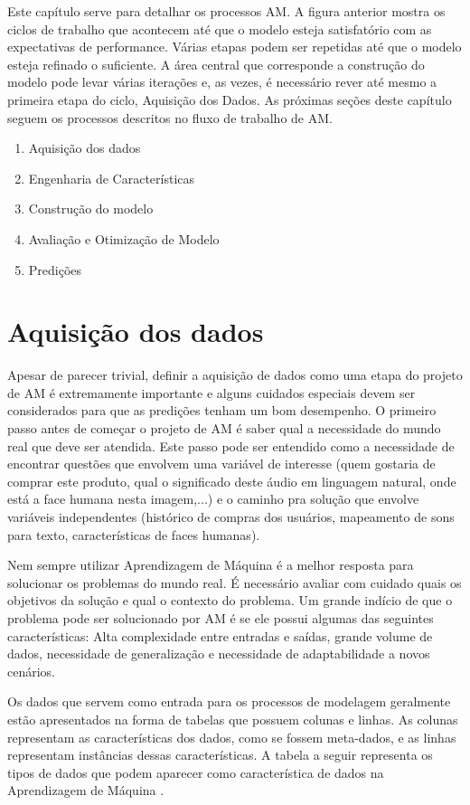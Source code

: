 Este capítulo serve para detalhar os processos AM. A figura anterior mostra os ciclos de trabalho que acontecem até que o modelo esteja satisfatório com as expectativas de performance. Várias etapas podem ser repetidas até que o modelo esteja refinado o suficiente. A área central que corresponde a construção do modelo pode levar várias iterações e, as vezes, é necessário rever até mesmo a primeira etapa do ciclo, Aquisição dos Dados. As próximas seções deste capítulo seguem os processos descritos no fluxo de trabalho de AM.

\begin{enumerate}
\item Aquisição dos dados
\item Engenharia de Características
\item Construção do modelo
\item Avaliação e Otimização de Modelo
\item Predições
\end{enumerate}

\section{Aquisição dos dados}
Apesar de parecer trivial, definir a aquisição de dados como uma etapa do projeto de AM é extremamente importante e alguns cuidados especiais devem ser considerados para que as predições tenham um bom desempenho. O primeiro passo antes de começar o projeto de AM é saber qual a necessidade do mundo real que deve ser atendida. Este passo pode ser entendido como a necessidade de encontrar questões que envolvem uma variável de interesse (quem gostaria de comprar este produto, qual o significado deste áudio em linguagem natural, onde está a face humana nesta imagem,...) e o caminho pra solução que envolve variáveis independentes (histórico de compras dos usuários, mapeamento de sons para texto, características de faces humanas).

Nem sempre utilizar Aprendizagem de Máquina é a melhor resposta para solucionar os problemas do mundo real. É necessário avaliar com cuidado quais os objetivos da solução e qual o contexto do problema. Um grande indício de que o problema pode ser solucionado por AM é se ele possui algumas das seguintes características: Alta complexidade entre entradas e saídas, grande volume de dados, necessidade de generalização e necessidade de adaptabilidade a novos cenários. 

Os dados que servem como entrada para os processos de modelagem geralmente estão apresentados na forma de tabelas que possuem colunas e linhas. As colunas representam as características dos dados, como se fossem meta-dados, e as linhas representam instâncias dessas características. A tabela a seguir representa os tipos de dados que podem aparecer como característica de dados na Aprendizagem de Máquina \cite{guy2010}.

